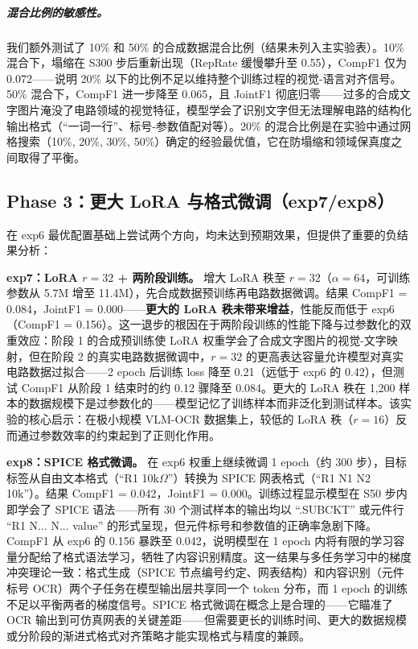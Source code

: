 \subparagraph{混合比例的敏感性。}
我们额外测试了 10\% 和 50\% 的合成数据混合比例（结果未列入主实验表）。10\% 混合下，塌缩在 S300 步后重新出现（RepRate 缓慢攀升至 0.55），CompF1 仅为 0.072——说明 20\% 以下的比例不足以维持整个训练过程的视觉-语言对齐信号。50\% 混合下，CompF1 进一步降至 0.065，且 JointF1 彻底归零——过多的合成文字图片淹没了电路领域的视觉特征，模型学会了识别文字但无法理解电路的结构化输出格式（``一词一行''、标号-参数值配对等）。20\% 的混合比例是在实验中通过网格搜索（10\%, 20\%, 30\%, 50\%）确定的经验最优值，它在防塌缩和领域保真度之间取得了平衡。

\subsection{Phase 3：更大 LoRA 与格式微调（exp7/exp8）}

在 exp6 最优配置基础上尝试两个方向，均未达到预期效果，但提供了重要的负结果分析：

\textbf{exp7：LoRA $r=32$ + 两阶段训练。}
增大 LoRA 秩至 $r=32$（$\alpha=64$，可训练参数从 5.7M 增至 11.4M），先合成数据预训练再电路数据微调。结果 CompF1 = 0.084，JointF1 = 0.000——\textbf{更大的 LoRA 秩未带来增益}，性能反而低于 exp6（CompF1 = 0.156）。这一退步的根因在于两阶段训练的性能下降与过参数化的双重效应：阶段 1 的合成预训练使 LoRA 权重学会了合成文字图片的视觉-文字映射，但在阶段 2 的真实电路数据微调中，$r=32$ 的更高表达容量允许模型对真实电路数据过拟合——2 epoch 后训练 loss 降至 0.21（远低于 exp6 的 0.42），但测试 CompF1 从阶段 1 结束时的约 0.12 骤降至 0.084。更大的 LoRA 秩在 1,200 样本的数据规模下是过参数化的——模型记忆了训练样本而非泛化到测试样本。该实验的核心启示：在极小规模 VLM-OCR 数据集上，较低的 LoRA 秩（$r=16$）反而通过参数效率的约束起到了正则化作用。

\textbf{exp8：SPICE 格式微调。}
在 exp6 权重上继续微调 1 epoch（约 300 步），目标标签从自由文本格式（``R1  10k$\Omega$''）转换为 SPICE 网表格式（``R1 N1 N2 10k''）。结果 CompF1 = 0.042，JointF1 = 0.000。训练过程显示模型在 S50 步内即学会了 SPICE 语法——所有 30 个测试样本的输出均以 ``.SUBCKT'' 或元件行 ``R1 N... N... value'' 的形式呈现，但元件标号和参数值的正确率急剧下降。CompF1 从 exp6 的 0.156 暴跌至 0.042，说明模型在 1 epoch 内将有限的学习容量分配给了格式语法学习，牺牲了内容识别精度。这一结果与多任务学习中的梯度冲突理论一致：格式生成（SPICE 节点编号约定、网表结构）和内容识别（元件标号 OCR）两个子任务在模型输出层共享同一个 token 分布，而 1 epoch 的训练不足以平衡两者的梯度信号。SPICE 格式微调在概念上是合理的——它瞄准了 OCR 输出到可仿真网表的关键差距——但需要更长的训练时间、更大的数据规模或分阶段的渐进式格式对齐策略才能实现格式与精度的兼顾。

